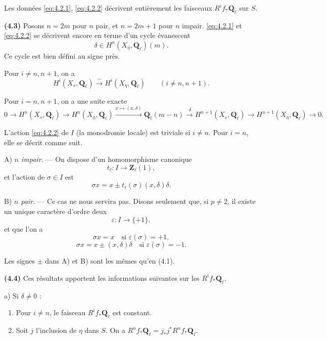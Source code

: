 \documentclass[12pt,a4paper]{amsart}
\theoremstyle{plain}
\theoremstyle{definition}
\theoremstyle{remark}
\newcommand{\Q}{\mathbf{Q}}
\newcommand{\Z}{\mathbf{Z}}
\numberwithin{equation}{section}
\begin{document}
Les donn\'ees \eqref{eq:4.2.1}, \eqref{eq:4.2.2} d\'ecrivent enti\`erement les faisceaux $R^i f_\ast\Q_\ell$ sur $S$.

\noindent \textbf{(4.3)} Posons $n=2m$ pour $n$ pair, et $n=2m+1$ pour $n$ impair. \eqref{eq:4.2.1} et \eqref{eq:4.2.2} se d\'ecrivent encore en terme d'un cycle \'evanescent
\begin{equation}\label{eq:4.3.1}
\delta \in H^n(X_{\overline{\eta}},\Q_\ell)(m).
\end{equation}
Ce cycle est bien d\'efini au signe pr\`es.

Pour $i\not=n,n+1$, on a
\begin{equation}\label{eq:4.3.2}
H^i(X_s,\Q_\ell) \xrightarrow{\sim} H^i(X_{\overline{\eta}},\Q_\ell) \qquad (i\not=n,n+1).
\end{equation}

Pour $i=n,n+1$, on a une suite exacte
\begin{equation}\label{eq:4.3.3}
0 \to H^n(X_s,\Q_\ell) \to H^n(X_{\overline{\eta}},\Q_\ell) \xrightarrow{x\mapsto(x,\delta)} \Q_\ell(m-n) \xrightarrow{\cdot\delta} H^{n+1}(X_s,\Q_\ell) \to H^{n+1}(X_{\overline{\eta}},\Q_\ell) \to 0.
\end{equation}

L'action \eqref{eq:4.2.2} de $I$ (la monodromie locale) est triviale si $i\not=n$. Pour $i=n$, elle se d\'ecrit comme suit.

\noindent A) \textit{$n$ impair.} --- On dispose d'un homomorphisme canonique
\[
t_\ell : I \longrightarrow \Z_\ell(1),
\]
et l'action de $\sigma\in I$ est
\[
\sigma x = x \pm t_\ell(\sigma)(x,\delta)\delta.
\]

\noindent B) \textit{$n$ pair.} --- Ce cas ne nous servira pas. Disons seulement que, si $p\not=2$, il existe un unique caract\`ere d'ordre deux
\[
\varepsilon : I \longrightarrow \{+1\},
\]
et que l'on a
\[
\sigma x = x \quad \text{si $\varepsilon(\sigma)=+1$},
\]
\[
\sigma x = x \pm (x,\delta)\delta \quad \text{si $\varepsilon(\sigma)=-1$}.
\]

Les signes $\pm$ dans A) et B) sont les m\^emes qu'en (4.1).

\noindent \textbf{(4.4)} Ces r\'esultats apportent les informations suivantes sur les $R^i f_\ast\Q_\ell$.

a) Si $\delta\not=0$ :
\begin{enumerate}
\item[1)] Pour $i\not=n$, le faisceau $R^i f_\ast\Q_\ell$ est constant.
\item[2)] Soit $j$ l'inclusion de $\eta$ dans $S$. On a $R^n f_\ast\Q_\ell = j_\ast j^\ast R^n f_\ast\Q_\ell$.
\end{enumerate}
\end{document}
